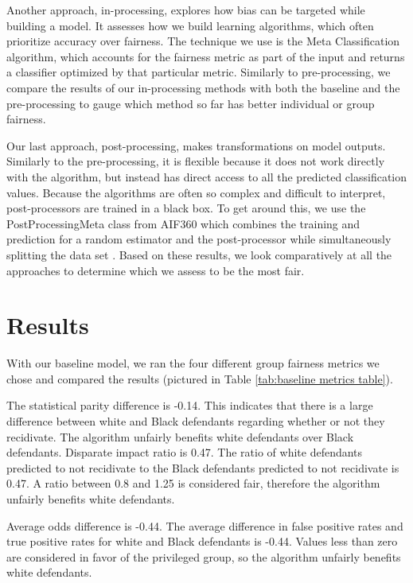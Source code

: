 \documentclass[water,article,submit,moreauthors,pdftex]{mdpi}
\begin{document}
Another approach, in-processing, explores how bias can be targeted while
building a model. It assesses how we build learning algorithms, which
often prioritize accuracy over fairness. The technique we use is the
Meta Classification algorithm, which accounts for the fairness metric as
part of the input and returns a classifier optimized by that particular
metric. Similarly to pre-processing, we compare the results of our
in-processing methods with both the baseline and the pre-processing to
gauge which method so far has better individual or group fairness.

Our last approach, post-processing, makes transformations on model
outputs. Similarly to the pre-processing, it is flexible because it does
not work directly with the algorithm, but instead has direct access to
all the predicted classification values. Because the algorithms are
often so complex and difficult to interpret, post-processors are trained
in a black box. To get around this, we use the PostProcessingMeta class
from AIF360 which combines the training and prediction for a random
estimator and the post-processor while simultaneously splitting the data
set \citep{aif360-oct-2018}. Based on these results, we look
comparatively at all the approaches to determine which we assess to be
the most fair.

\hypertarget{results}{%
\section{Results}\label{results}}

With our baseline model, we ran the four different group fairness
metrics we chose and compared the results (pictured in Table
\ref{tab:baseline metrics table}).

The statistical parity difference is -0.14. This indicates that there is
a large difference between white and Black defendants regarding whether
or not they recidivate. The algorithm unfairly benefits white defendants
over Black defendants. Disparate impact ratio is 0.47. The ratio of
white defendants predicted to not recidivate to the Black defendants
predicted to not recidivate is 0.47. A ratio between 0.8 and 1.25 is
considered fair, therefore the algorithm unfairly benefits white
defendants.

Average odds difference is -0.44. The average difference in false
positive rates and true positive rates for white and Black defendants is
-0.44. Values less than zero are considered in favor of the privileged
group, so the algorithm unfairly benefits white defendants.
\end{document}
